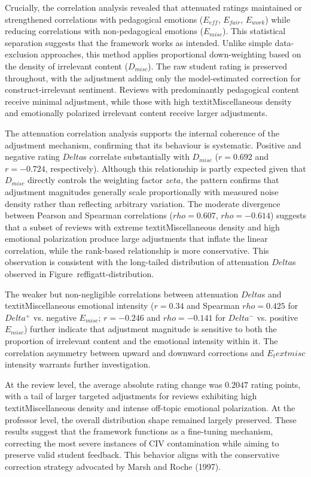 Crucially, the correlation analysis revealed that attenuated ratings maintained or strengthened correlations with pedagogical emotions ($E_{eff}$, $E_{fair}$, $E_{work}$) while reducing correlations with non-pedagogical emotions ($E_{misc}$). This statistical separation suggests that the framework works as intended. Unlike simple data-exclusion approaches, this method applies proportional down-weighting based on the density of irrelevant content ($D_{misc}$). The raw student rating is preserved throughout, with the adjustment adding only the model-estimated correction for construct-irrelevant sentiment. Reviews with predominantly pedagogical content receive minimal adjustment, while those with high textit{Miscellaneous} density and emotionally polarized irrelevant content receive larger adjustments. 

The attenuation correlation analysis supports the internal coherence of the adjustment mechanism, confirming that its behaviour is systematic. Positive and negative rating $Delta$s correlate substantially with $D_{misc}$ ($r = 0.692$ and $r = -0.724$, respectively). Although this relationship is partly expected given that $D_{misc}$ directly controls the weighting factor $zeta$, the pattern confirms that adjustment magnitudes generally scale proportionally with measured noise density rather than reflecting arbitrary variation. The moderate divergence between Pearson and Spearman correlations ($rho = 0.607$, $rho = -0.614$) suggests that a subset of reviews with extreme textit{Miscellaneous} density and high emotional polarization produce large adjustments that inflate the linear correlation, while the rank-based relationship is more conservative. This observation is consistent with the long-tailed distribution of attenuation $Delta$s observed in Figure~ref{figatt-distribution}. 

The weaker but non-negligible correlations between attenuation $Delta$s and textit{Miscellaneous} emotional intensity ($r = 0.34$ and Spearman $rho = 0.425$ for $Delta^+$ vs. negative $E_{misc}$; $r = -0.246$ and $rho = -0.141$ for $Delta^-$ vs. positive $E_{misc}$) further indicate that adjustment magnitude is sensitive to both the proportion of irrelevant content and the emotional intensity within it. The correlation asymmetry between upward and downward corrections and $E_text{misc}$ intensity warrants further investigation.

At the review level, the average absolute rating change was $0.2047$ rating points, with a tail of larger targeted adjustments for reviews exhibiting high textit{Miscellaneous} density and intense off-topic emotional polarization. At the professor level, the overall distribution shape remained largely preserved. These results suggest that the framework functions as a fine-tuning mechanism, correcting the most severe instances of CIV contamination while aiming to preserve valid student feedback. This behavior aligns with the conservative correction strategy advocated by Marsh and Roche (1997).

